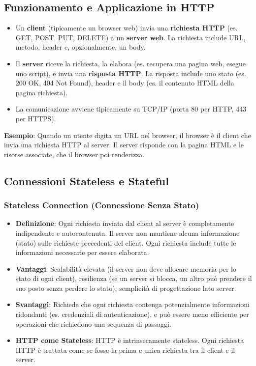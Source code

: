 \subsection{Funzionamento e Applicazione in HTTP}
\begin{itemize}
    \item Un \textbf{client} (tipicamente un browser web) invia una \textbf{richiesta HTTP} (es. GET, POST, PUT, DELETE) a un \textbf{server web}. La richiesta include URL, metodo, header e, opzionalmente, un body.
    \item Il \textbf{server} riceve la richiesta, la elabora (es. recupera una pagina web, esegue uno script), e invia una \textbf{risposta HTTP}. La risposta include uno stato (es. 200 OK, 404 Not Found), header e il body (es. il contenuto HTML della pagina richiesta).
    \item La comunicazione avviene tipicamente su TCP/IP (porta 80 per HTTP, 443 per HTTPS).
\end{itemize}
\textbf{Esempio}: Quando un utente digita un URL nel browser, il browser è il client che invia una richiesta HTTP al server. Il server risponde con la pagina HTML e le risorse associate, che il browser poi renderizza.

\subsection{Connessioni Stateless e Stateful}

\subsubsection{Stateless Connection (Connessione Senza Stato)}
\begin{itemize}
    \item \textbf{Definizione}: Ogni richiesta inviata dal client al server è completamente indipendente e autocontenuta. Il server non mantiene alcuna informazione (stato) sulle richieste precedenti del client. Ogni richiesta include tutte le informazioni necessarie per essere elaborata.
    \item \textbf{Vantaggi}: Scalabilità elevata (il server non deve allocare memoria per lo stato di ogni client), resilienza (se un server si blocca, un altro può prendere il suo posto senza perdere lo stato), semplicità di progettazione lato server.
    \item \textbf{Svantaggi}: Richiede che ogni richiesta contenga potenzialmente informazioni ridondanti (es. credenziali di autenticazione), e può essere meno efficiente per operazioni che richiedono una sequenza di passaggi.
    \item \textbf{HTTP come Stateless}: HTTP è intrinsecamente stateless. Ogni richiesta HTTP è trattata come se fosse la prima e unica richiesta tra il client e il server.

\end{itemize}

